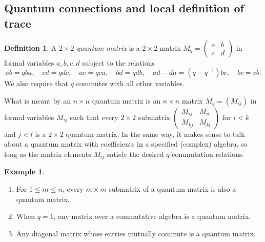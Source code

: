 \documentclass[12pt, reqno]{amsart}
\theoremstyle{definition}
\newtheorem{defi}[theo]{Definition}
\newtheorem{exam}[theo]{Example}
\begin{document}
\subsection{Quantum connections and local definition of trace}

\begin{defi}\label{defi:quantummatrix}
A \emph{$2\times2$ quantum matrix} is a $2\times2$ matrix $M_q=\begin{pmatrix}a&b\\c&d\end{pmatrix}$ in formal variables $a,b,c,d$ subject to the relations 
$$
ab=qba, \quad cd=qdc, \quad ac=qca, \quad bd=qdb, \quad ad-da=(q-q^{-1})bc, \quad bc=cb.
$$  
We also require that $q$ commutes with all other variables. 

What is meant by an $n\times n$ quantum matrix is an $n\times n$ matrix $M_q=(M_{ij})$ in formal variables $M_{ij}$ such that every $2\times2$ submatrix $\begin{pmatrix}M_{ij}&M_{il}\\M_{kj}&M_{kl}\end{pmatrix}$ for $i<k$ and $j<l$ is a $2\times2$ quantum matrix.  In the same way, it makes sense to talk about a quantum matrix with coefficients in a specified (complex) algebra, so long as the matrix elements $M_{ij}$ satisfy the desired $q$-commutation relations.  
\end{defi}

\begin{exam}\label{exam:quantummatrixexamples}
\begin{enumerate}
\item
For $1\leq m\leq n$, every $m\times m$ submatrix of a quantum matrix is also a quantum matrix.  
\item\label{item2:exam:quantummatrixexamples}
When $q=1$, any matrix over a commutative algebra is a quantum matrix.  
\item\label{item:exam:quantummatrixexamples}
Any diagonal matrix whose entries mutually commute is a quantum matrix.  
\end{enumerate}
\end{exam}
\end{document}
